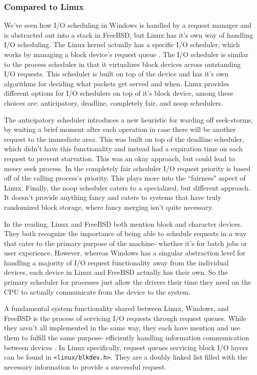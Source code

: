 \subsubsection{Compared to Linux}
\label{sub:Scheduling Linux}
\par We've seen how I/O scheduling in Windows is handled by a request manager and is abstracted out into a stack in FreeBSD, but Linux has it's own way of handling I/O scheduling.
The Linux kernel actually has a specific I/O scheduler, which works by managing a block device's request queue \cite{linux:1}.
The I/O scheduler is similar to the process scheduler in that it virtualizes block devices across outstanding I/O requests.
This scheduler is built on top of the device and has it's own algorithms for deciding what packets get served and when.
Linux provides different options for I/O schedulers on top of it's block device, among these choices are: anticipatory, deadline, completely fair, and noop schedulers.

\par The anticipatory scheduler introduces a new heuristic for warding off seek-storms, by waiting a brief moment after each operation in case there will be another request to the immediate area.
This was built on top of the deadline scheduler, which didn't have this functionality and instead had a expiration time on each request to prevent starvation.
This was an okay approach, but could lead to messy seek process.
In the completely fair scheduler I/O request priority is based off of the calling process's priority.
This plays more into the ``fairness" aspect of Linux.
Finally, the noop scheduler caters to a specialized, but different approach.
It doesn't provide anything fancy and caters to systems that have truly randomized block storage, where fancy merging isn't quite necessary.

\par In the reading, Linux and FreeBSD both mention block and character devices.
They both recognize the importance of being able to schedule requests in a way that cater to the primary purpose of the machine- whether it's for batch jobs or user experience.
However, whereas Windows has a singular abstraction level for handling a majority of I/O request functionality away from the individual devices, each device in Linux and FreeBSD actually has their own.
So the primary scheduler for processes just allow the drivers their time they need on the CPU to actually communicate from the device to the system.

\par A fundamental system functionality shared between Linux, Windows, and FreeBSD is the process of servicing I/O requests through request queues.
While they aren't all implemented in the same way, they each have mention and use them to fulfill the same purpose- efficiently handling information communication between devices \cite{bsd:1} \cite{win:2} \cite{linux:1}.
In Linux specifically, request queues servicing block I/O layers can be found in \texttt{<linux/blkdev.h>}.
They are a doubly linked list filled with the necessary information to provide a successful request.


